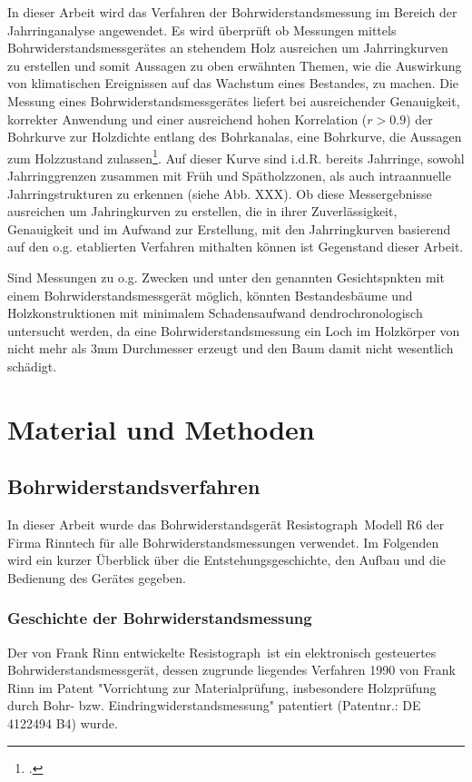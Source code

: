 \documentclass[a4paper, halfparskip]{article}
\def\SymbReg{\textsuperscript{\textregistered}}
\begin{document}
In dieser Arbeit wird das Verfahren der Bohrwiderstandsmessung im Bereich der
Jahrringanalyse angewendet. Es wird überprüft ob Messungen mittels
Bohrwiderstandsmessgerätes an stehendem Holz ausreichen um Jahrringkurven zu
erstellen und somit Aussagen zu oben erwähnten Themen, wie die Auswirkung von
klimatischen Ereignissen auf das Wachstum eines Bestandes, zu machen. Die
Messung eines Bohrwiderstandsmessgerätes liefert bei ausreichender
Genauigkeit, korrekter Anwendung und einer ausreichend hohen Korrelation
($r>0.9$) der Bohrkurve zur Holzdichte entlang des Bohrkanalas, eine
Bohrkurve, die Aussagen zum Holzzustand
zulassen\footcite[1]{rinn:resi_drill_transition}. Auf dieser Kurve sind i.d.R.
bereits Jahrringe, sowohl Jahrringgrenzen zusammen mit Früh und Spätholzzonen,
als auch intraannuelle Jahrringstrukturen zu erkennen (siehe Abb. XXX). Ob
diese Messergebnisse ausreichen um Jahringkurven zu erstellen, die in ihrer
Zuverlässigkeit, Genauigkeit und im Aufwand zur Erstellung, mit den
Jahrringkurven basierend auf den o.g. etablierten Verfahren mithalten können
ist Gegenstand dieser Arbeit.

Sind Messungen zu o.g. Zwecken und unter den genannten Gesichtspnkten mit
einem Bohrwiderstandsmessgerät möglich, könnten Bestandesbäume und
Holzkonstruktionen mit minimalem Schadensaufwand dendrochronologisch
untersucht werden, da eine Bohrwiderstandsmessung ein Loch im Holzkörper von
nicht mehr als 3mm Durchmesser erzeugt und den Baum damit nicht wesentlich
schädigt.

\section{Material und Methoden}\label{sec:material}
\subsection{Bohrwiderstandsverfahren}\label{subsec:bohrwiderstandsverfahren}
In dieser Arbeit wurde das Bohrwiderstandsgerät Resistograph\SymbReg\ Modell
R6 der Firma Rinntech für alle Bohrwiderstandsmessungen verwendet. Im
Folgenden wird ein kurzer Überblick über die Entstehungsgeschichte, den Aufbau
und die Bedienung des Gerätes gegeben.  

\subsubsection{Geschichte der
Bohrwiderstandsmessung}\label{subsubsec:geschichte_bwm}
Der von Frank Rinn entwickelte Resistograph\SymbReg\ ist ein elektronisch
gesteuertes Bohrwiderstandsmessgerät, dessen zugrunde liegendes Verfahren 1990
von Frank Rinn im Patent "Vorrichtung zur Materialprüfung, insbesondere
Holzprüfung durch Bohr- bzw. Eindringwiderstandsmessung"{} patentiert
(Patentnr.: DE 4122494 B4) wurde.
\end{document}
